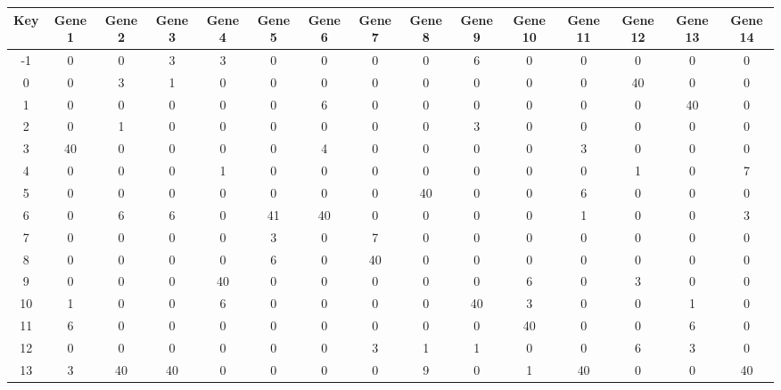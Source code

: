 \begin{tabular}{|c|c|c|c|c|c|c|c|c|c|c|c|c|c|c|}
\hline
Key & Gene 1 & Gene 2 & Gene 3 & Gene 4 & Gene 5 & Gene 6 & Gene 7 & Gene 8 & Gene 9 & Gene 10 & Gene 11 & Gene 12 & Gene 13 & Gene 14 \\
\hline
-1 & 0 & 0 & 3 & 3 & 0 & 0 & 0 & 0 & 6 & 0 & 0 & 0 & 0 & 0 \\
0 & 0 & 3 & 1 & 0 & 0 & 0 & 0 & 0 & 0 & 0 & 0 & 40 & 0 & 0 \\
1 & 0 & 0 & 0 & 0 & 0 & 6 & 0 & 0 & 0 & 0 & 0 & 0 & 40 & 0 \\
2 & 0 & 1 & 0 & 0 & 0 & 0 & 0 & 0 & 3 & 0 & 0 & 0 & 0 & 0 \\
3 & 40 & 0 & 0 & 0 & 0 & 4 & 0 & 0 & 0 & 0 & 3 & 0 & 0 & 0 \\
4 & 0 & 0 & 0 & 1 & 0 & 0 & 0 & 0 & 0 & 0 & 0 & 1 & 0 & 7 \\
5 & 0 & 0 & 0 & 0 & 0 & 0 & 0 & 40 & 0 & 0 & 6 & 0 & 0 & 0 \\
6 & 0 & 6 & 6 & 0 & 41 & 40 & 0 & 0 & 0 & 0 & 1 & 0 & 0 & 3 \\
7 & 0 & 0 & 0 & 0 & 3 & 0 & 7 & 0 & 0 & 0 & 0 & 0 & 0 & 0 \\
8 & 0 & 0 & 0 & 0 & 6 & 0 & 40 & 0 & 0 & 0 & 0 & 0 & 0 & 0 \\
9 & 0 & 0 & 0 & 40 & 0 & 0 & 0 & 0 & 0 & 6 & 0 & 3 & 0 & 0 \\
10 & 1 & 0 & 0 & 6 & 0 & 0 & 0 & 0 & 40 & 3 & 0 & 0 & 1 & 0 \\
11 & 6 & 0 & 0 & 0 & 0 & 0 & 0 & 0 & 0 & 40 & 0 & 0 & 6 & 0 \\
12 & 0 & 0 & 0 & 0 & 0 & 0 & 3 & 1 & 1 & 0 & 0 & 6 & 3 & 0 \\
13 & 3 & 40 & 40 & 0 & 0 & 0 & 0 & 9 & 0 & 1 & 40 & 0 & 0 & 40 \\
\hline
\end{tabular}